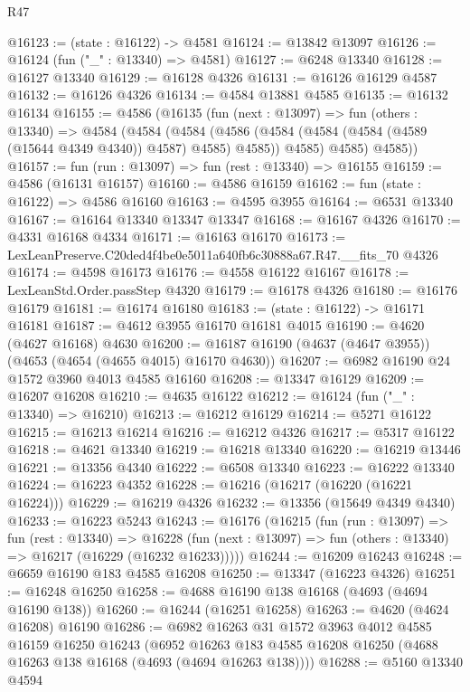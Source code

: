 \begin{lexlean}{R47}
\begin{coremodule}
@16123 := (state : @16122) -> @4581
@16124 := @13842 @13097
@16126 := @16124 (fun ("_" : @13340) => @4581)
@16127 := @6248 @13340
@16128 := @16127 @13340
@16129 := @16128 @4326
@16131 := @16126 @16129 @4587
@16132 := @16126 @4326
@16134 := @4584 @13881 @4585
@16135 := @16132 @16134
@16155 := @4586
    (@16135
      (fun (next : @13097) =>
      fun (others : @13340) =>
      @4584
        (@4584
          (@4584
            (@4586 (@4584 (@4584 (@4584 (@4589 (@15644 @4349 @4340)) @4587) @4585) @4585))
            @4585)
          @4585)
        @4585))
@16157 := fun (run : @13097) => fun (rest : @13340) => @16155
@16159 := @4586 (@16131 @16157)
@16160 := @4586 @16159
@16162 := fun (state : @16122) => @4586 @16160
@16163 := @4595 @3955
@16164 := @6531 @13340
@16167 := @16164 @13340 @13347 @13347
@16168 := @16167 @4326
@16170 := @4331 @16168 @4334
@16171 := @16163 @16170
@16173 := LexLeanPreserve.C20ded4f4be0e5011a640fb6c30888a67.R47.__fits_70 @4326
@16174 := @4598 @16173
@16176 := @4558 @16122 @16167
@16178 := LexLeanStd.Order.passStep @4320
@16179 := @16178 @4326
@16180 := @16176 @16179
@16181 := @16174 @16180
@16183 := (state : @16122) -> @16171 @16181
@16187 := @4612 @3955 @16170 @16181 @4015
@16190 := @4620 (@4627 @16168) @4630
@16200 := @16187 @16190 (@4637 (@4647 @3955)) (@4653 (@4654 (@4655 @4015) @16170 @4630))
@16207 := @6982 @16190 @24 @1572 @3960 @4013 @4585 @16160
@16208 := @13347 @16129
@16209 := @16207 @16208
@16210 := @4635 @16122
@16212 := @16124 (fun ("_" : @13340) => @16210)
@16213 := @16212 @16129
@16214 := @5271 @16122
@16215 := @16213 @16214
@16216 := @16212 @4326
@16217 := @5317 @16122
@16218 := @4621 @13340
@16219 := @16218 @13340
@16220 := @16219 @13446
@16221 := @13356 @4340
@16222 := @6508 @13340
@16223 := @16222 @13340
@16224 := @16223 @4352
@16228 := @16216 (@16217 (@16220 (@16221 @16224)))
@16229 := @16219 @4326
@16232 := @13356 (@15649 @4349 @4340)
@16233 := @16223 @5243
@16243 := @16176
    (@16215
      (fun (run : @13097) =>
      fun (rest : @13340) =>
      @16228 (fun (next : @13097) => fun (others : @13340) => @16217 (@16229 (@16232 @16233)))))
@16244 := @16209 @16243
@16248 := @6659 @16190 @183 @4585 @16208
@16250 := @13347 (@16223 @4326)
@16251 := @16248 @16250
@16258 := @4688 @16190 @138 @16168 (@4693 (@4694 @16190 @138))
@16260 := @16244 (@16251 @16258)
@16263 := @4620 (@4624 @16208) @16190
@16286 := @6982
    @16263
    @31
    @1572
    @3963
    @4012
    @4585
    @16159
    @16250
    @16243
    (@6952 @16263 @183 @4585 @16208 @16250 (@4688 @16263 @138 @16168 (@4693 (@4694 @16263 @138))))
@16288 := @5160 @13340 @4594

\end{coremodule}
\end{lexlean}
